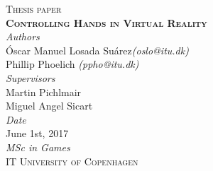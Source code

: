 \begin{titlepage}
\begin{center}

\textsc{\large Thesis paper}\\[2cm]

\textsc{\huge \textbf{Controlling Hands in Virtual Reality}}\\[8.2cm]

\textit{Authors}\\
Óscar Manuel Losada Suárez\textit{(oslo@itu.dk)}\\
Phillip Phoelich \textit{(ppho@itu.dk)}\\[1cm]

\textit{Supervisors}\\
Martin Pichlmair\\
Miguel Angel Sicart\\[1cm]

\textit{Date}\\
June 1st, 2017\\

\vfill
\textit{MSc in Games}\\
\textsc{IT University of Copenhagen}

\end{center}
\end{titlepage}

\restoregeometry